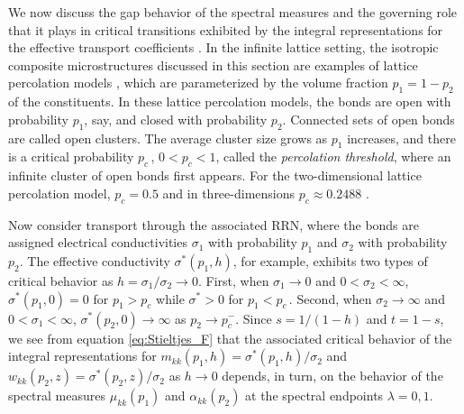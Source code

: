 \documentclass{cmslatex}
\begin{document}
We now discuss the gap behavior of the spectral measures
\cite{Murphy:JMP:063506,Jonckheere_Luck_JPA_1998} and the governing
role that it plays in critical transitions exhibited by the integral
representations for the effective transport coefficients
\cite{Murphy:JMP:063506,Golden:PRL-3935}. In the    
infinite lattice setting, the isotropic composite microstructures
discussed in this section are examples of lattice percolation models
\cite{Stauffer-92,Torquato:RHM-02}, which are parameterized by the
volume fraction $p_1=1-p_2$ of the constituents. In these 
lattice percolation models, the bonds are open with probability $p_1$,
say, and closed with probability $p_2$. Connected sets of open bonds
are called open clusters. The average cluster size grows as $p_1$
increases, and there is a critical probability $p_c\,$, $0<p_c<1$,
called the \emph{percolation threshold}, where an infinite cluster of
open bonds first appears. For the two-dimensional lattice percolation
model, $p_c=0.5$ and in three-dimensions $p_c\approx0.2488$
\cite{Stauffer-92,Torquato:RHM-02}.



Now consider transport through the
associated RRN, where the bonds are assigned electrical conductivities 
$\sigma_1$ with probability $p_1$ and $\sigma_2$ with probability $p_2$. The
effective conductivity $\sigma^*(p_1,h)$, for example, exhibits two types
of critical behavior as $h=\sigma_1/\sigma_2\to0$. First, when $\sigma_1\to0$ and
$0<\sigma_2<\infty$, $\sigma^*(p_1,0)=0$ for $p_1>p_c$ while $\sigma^*>0$ for
$p_1<p_c\,$. Second, when $\sigma_2\to\infty$ and $0<\sigma_1<\infty$, $\sigma^*(p_2,0) \to \infty$ as
$p_2\to p_c^-$. Since $s=1/(1-h)$ and $t=1-s$, we see
from equation \eqref{eq:Stieltjes_F} that the associated critical
behavior of the integral representations for
$m_{kk}(p_1,h)=\sigma^*(p_1,h)/\sigma_2$ and $w_{kk}(p_2,z)=\sigma^*(p_2,z)/\sigma_2$ as
$h\to0$ depends, in turn, on the behavior of the spectral measures
$\mu_{kk}(p_1)$ and $\alpha_{kk}(p_2)$ at the spectral endpoints $\lambda=0,1$. 
\end{document}
